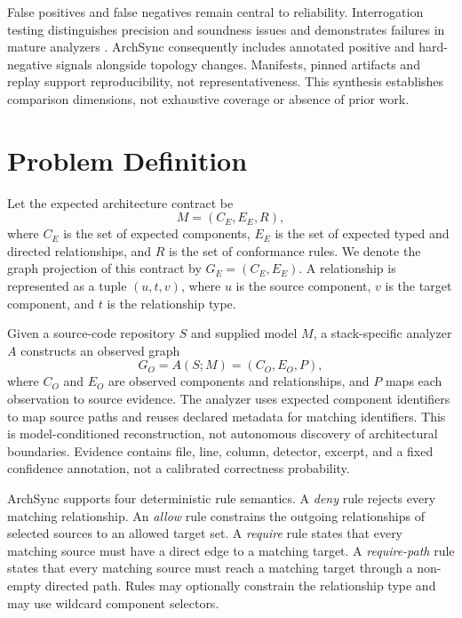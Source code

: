 \documentclass[conference]{IEEEtran}
\begin{document}
False positives and false negatives remain central to reliability. Interrogation testing distinguishes precision and soundness issues and demonstrates failures in mature analyzers \cite{kaindlstorfer2024interrogation}. ArchSync consequently includes annotated positive and hard-negative signals alongside topology changes. Manifests, pinned artifacts and replay support reproducibility, not representativeness. This synthesis establishes comparison dimensions, not exhaustive coverage or absence of prior work.

\section{Problem Definition}

Let the expected architecture contract be
\begin{equation}
  M = (C_E, E_E, R),
\end{equation}
where $C_E$ is the set of expected components, $E_E$ is the set of expected typed and directed relationships, and $R$ is the set of conformance rules. We denote the graph projection of this contract by $G_E=(C_E,E_E)$. A relationship is represented as a tuple $(u,t,v)$, where $u$ is the source component, $v$ is the target component, and $t$ is the relationship type.

Given a source-code repository $S$ and supplied model $M$, a stack-specific analyzer $A$ constructs an observed graph
\begin{equation}
  G_O = A(S;M) = (C_O, E_O, P),
\end{equation}
where $C_O$ and $E_O$ are observed components and relationships, and $P$ maps each observation to source evidence. The analyzer uses expected component identifiers to map source paths and reuses declared metadata for matching identifiers. This is model-conditioned reconstruction, not autonomous discovery of architectural boundaries. Evidence contains file, line, column, detector, excerpt, and a fixed confidence annotation, not a calibrated correctness probability.

ArchSync supports four deterministic rule semantics. A \emph{deny} rule rejects every matching relationship. An \emph{allow} rule constrains the outgoing relationships of selected sources to an allowed target set. A \emph{require} rule states that every matching source must have a direct edge to a matching target. A \emph{require-path} rule states that every matching source must reach a matching target through a non-empty directed path. Rules may optionally constrain the relationship type and may use wildcard component selectors.
\end{document}
